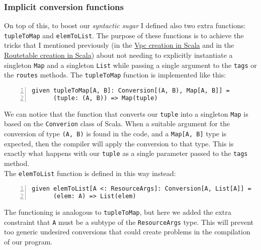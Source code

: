 \subsubsection{Implicit conversion functions}
\label{sssec:implicit-converion-functions}
On top of this, to boost our \textit{syntactic sugar} I defined also two extra functions: \texttt{tupleToMap} and \texttt{elemToList}.
The purpose of these functions is to achieve the tricks that I mentioned previously (in the \hyperref[sssec:vpc-creation-scala]{Vpc creation in Scala} and in the \hyperref[sssec:routetable-creation-scala]{Routetable creation in Scala}) about not needing to explicitly instantiate a singleton \texttt{Map} and a singleton \texttt{List} while passing a single argument to the \texttt{tags} or the \texttt{routes} methods.
The \texttt{tupleToMap} function is implemented like this:\\
\begin{minipage}{\linewidth}
\begin{lstlisting}[numbers=left, numberstyle=\tiny, numbersep=-5pt, stepnumber=1, linewidth=420pt]
  given tupleToMap[A, B]: Conversion[(A, B), Map[A, B]] =
	  (tuple: (A, B)) => Map(tuple)
\end{lstlisting}
\end{minipage}
We can notice that the function that converts our \texttt{tuple} into a singleton \texttt{Map} is based on the \texttt{Converion} class of Scala.
When a suitable argument for the conversion of type \texttt{(A, B)} is found in the code, and a \texttt{Map[A, B]} type is expected, then the compiler will apply the conversion to that type.
This is exactly what happens with our \texttt{tuple} as a single parameter passed to the \texttt{tags} method.\\
The \texttt{elemToList} function is defined in this way instead:\\
\begin{minipage}{\linewidth}
\begin{lstlisting}[numbers=left, numberstyle=\tiny, numbersep=-5pt, stepnumber=1, linewidth=420pt]
  given elemToList[A <: ResourceArgs]: Conversion[A, List[A]] =
	  (elem: A) => List(elem)
\end{lstlisting}
\end{minipage}
The functioning is analogous to \texttt{tupleToMap}, but here we added the extra constraint that \texttt{A} must be a subtype of the \texttt{ResourceArgs} type.
This will prevent too generic undesired conversions that could create problems in the compilation of our program.

